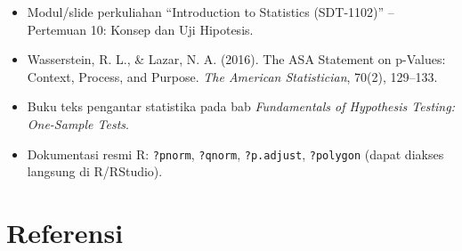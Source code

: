 \documentclass[
  indonesian,
  letterpaper,
]{book}
\providecommand{\tightlist}{%
  \setlength{\itemsep}{0pt}\setlength{\parskip}{0pt}}
\begin{document}
\begin{itemize}
\tightlist
\item
  Modul/slide perkuliahan ``Introduction to Statistics (SDT-1102)'' --
  Pertemuan 10: Konsep dan Uji Hipotesis.
\item
  Wasserstein, R. L., \& Lazar, N. A. (2016). The ASA Statement on
  p-Values: Context, Process, and Purpose. \emph{The American
  Statistician}, 70(2), 129--133.
\item
  Buku teks pengantar statistika pada bab \emph{Fundamentals of
  Hypothesis Testing: One-Sample Tests}.
\item
  Dokumentasi resmi R: \texttt{?pnorm}, \texttt{?qnorm},
  \texttt{?p.adjust}, \texttt{?polygon} (dapat diakses langsung di
  R/RStudio).
\end{itemize}


\chapter*{Referensi}\label{referensi}


\protect{}\label{refs}


\backmatter
\end{document}
